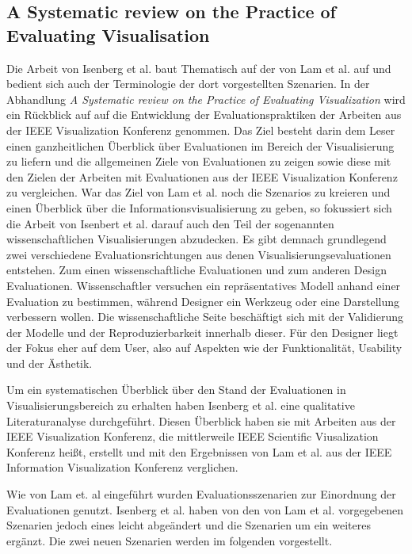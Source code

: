 \documentclass[draft=false
              ,paper=a4
              ,twoside=false
              ,fontsize=11pt
              ,headsepline
              ,BCOR10mm
              ,DIV11
              ]{scrbook}
\begin{document}
\subsection{A Systematic review on the Practice of Evaluating Visualisation} %
\label{sub:a_systematic_review_on_the_practice_of_evaluating_visualisation}
Die Arbeit von Isenberg et al. \cite{isenberg_systematic_2013} baut Thematisch auf der von Lam et al. auf \cite{lam_empirical_2012} und bedient sich auch der Terminologie der dort vorgestellten Szenarien. In der Abhandlung \textit{A Systematic review on the Practice of Evaluating Visualization} wird ein Rückblick auf auf die Entwicklung der Evaluationspraktiken der Arbeiten aus der IEEE Visualization Konferenz genommen. Das Ziel besteht darin dem Leser einen ganzheitlichen Überblick über Evaluationen im Bereich der Visualisierung zu liefern und die allgemeinen Ziele von Evaluationen zu zeigen sowie diese mit den Zielen der Arbeiten mit Evaluationen aus der IEEE Visualization Konferenz zu vergleichen. War das Ziel von Lam et al. noch die Szenarios zu kreieren und einen Überblick über die Informationsvisualisierung zu geben, so fokussiert sich die Arbeit von Isenbert et al. darauf auch den Teil der sogenannten wissenschaftlichen Visualisierungen abzudecken. Es gibt demnach grundlegend zwei verschiedene Evaluationsrichtungen aus denen Visualisierungsevaluationen entstehen. Zum einen wissenschaftliche Evaluationen und zum anderen Design Evaluationen. Wissenschaftler versuchen ein repräsentatives Modell anhand einer Evaluation zu bestimmen, während Designer ein Werkzeug oder eine Darstellung verbessern wollen. Die wissenschaftliche Seite beschäftigt sich mit der Validierung der Modelle und der Reproduzierbarkeit innerhalb dieser. Für den Designer liegt der Fokus eher auf dem User, also auf Aspekten wie der Funktionalität, Usability und der Ästhetik.

Um ein systematischen Überblick über den Stand der Evaluationen in Visualisierungsbereich zu erhalten haben Isenberg et al. eine qualitative Literaturanalyse durchgeführt. Diesen Überblick haben sie mit Arbeiten aus der IEEE Visualization Konferenz, die mittlerweile IEEE Scientific Viusalization Konferenz heißt, erstellt und mit den Ergebnissen von Lam et al. aus der IEEE Information Visualization Konferenz verglichen. 

Wie von Lam et. al eingeführt wurden Evaluationsszenarien zur Einordnung der Evaluationen genutzt. Isenberg et al. haben von den von Lam et al. vorgegebenen Szenarien jedoch eines leicht abgeändert und die Szenarien um ein weiteres ergänzt. Die zwei neuen Szenarien werden im folgenden vorgestellt.
\end{document}
